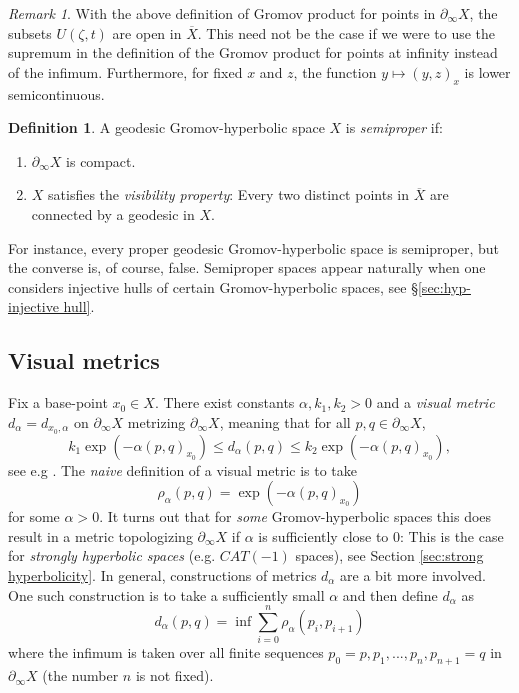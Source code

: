 \documentclass[12pt]{amsbook}%
\theoremstyle{definition}
\newtheorem{defi}[thm]{Definition}
\theoremstyle{remark}
\newtheorem{rem}[thm]{Remark}
\numberwithin{section}{chapter}
\numberwithin{subsection}{section}
\numberwithin{figure}{chapter}
\def\al{\alpha}
\def\geo{\partial_\infty}
\def\ol{\overline}
\begin{document}
\begin{rem}
With the above definition of Gromov product for points in $\geo X$, %
the subsets $U(\zeta,t)$ 
are open in $\ol{X}$. This need not be the case 
if we were to use the supremum in the definition of the Gromov product for points at infinity 
instead of the infimum. Furthermore, for fixed $x$ and $z$, the function $y\mapsto (y,z)_x$ is lower semicontinuous. 
\end{rem}

\begin{defi}\label{def:semiproper}
 A geodesic Gromov-hyperbolic space $X$ is {\em semiproper} if: 
\begin{enumerate}
\item $\geo X$ is compact. 

\item $X$ satisfies the {\em visibility property}: 
Every two distinct points in $\ol{X}$ are connected by a geodesic in $X$.  
\end{enumerate}
\end{defi}

For instance, every proper geodesic Gromov-hyperbolic space is semiproper, but the converse is, of course, false. 
Semiproper spaces appear naturally when one considers injective hulls of certain Gromov-hyperbolic spaces, see \S \ref{sec:hyp-injective hull}.  

\subsection{Visual metrics}\label{sec:Visual metrics}

Fix a base-point $x_0\in X$.  There exist constants $\alpha,k_1,k_2>0$  and a {\em visual metric} 
$d_{\alpha}=d_{x_0,\alpha}$ on $\geo X$ metrizing $\geo X$, meaning that for all $p, q\in \geo X$, 
\begin{equation}\label{eq:visual}
k_1\exp(-\alpha (p,q)_{x_0})\leqslant d_{\alpha}(p,q)\leqslant k_2\exp(-\alpha (p,q)_{x_0}),
\end{equation}
see e.g \cite[Section 5]{Vaisala}. The {\em naive} definition of a visual metric is to take 
$$
\rho_\alpha(p,q)= \exp(-\alpha (p,q)_{x_0})$$ 
for some $\alpha>0$. It turns out that for {\em some} Gromov-hyperbolic spaces this does result in a metric 
topologizing $\geo X$ if $\al$ is sufficiently close to $0$: This is the case for  
 {\em strongly hyperbolic spaces} (e.g. $CAT(-1)$ spaces), 
 see Section \ref{sec:strong hyperbolicity}. In general, constructions of metrics $d_\alpha$ are a bit more involved. One such construction is to take a sufficiently small $\al$ 
 and then define  $d_{\alpha}$ as
 $$
 d_{\alpha}(p,q)= \inf \sum_{i=0}^n \rho_\al(p_i, p_{i+1})
 $$
where the infimum is taken over all finite sequences $p_0=p, p_1,...,p_n, p_{n+1}=q$ in $\geo X$ (the number $n$ is not fixed). 
\end{document}
